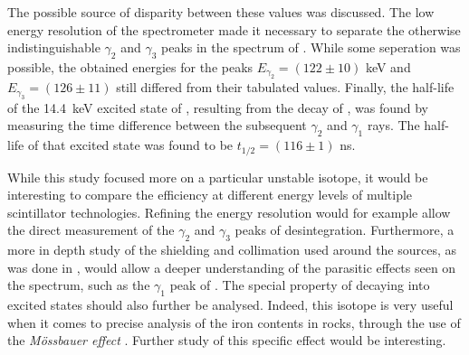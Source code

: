 The possible source of disparity between these values was discussed.
The low energy resolution of the spectrometer made it necessary to separate the otherwise indistinguishable $\gamma_2$ and $\gamma_3$ peaks in the spectrum of \cobalt.
While some seperation was possible, the obtained energies for the peaks \(E_{\gamma_2} = (122 \pm 10)\) keV and \(E_{\gamma_3} = (126 \pm 11)\) still differed from their tabulated values.
Finally, the half-life of the \mbox{14.4 keV} excited state of \iron, resulting from the decay of \cobalt, was found by measuring the time difference between the subsequent \(\gamma_2\) and \(\gamma_1\) rays.
The half-life of that excited state was found to be \(t_{1/2} = (116 \pm 1)\) ns.

While this study focused more on a particular unstable isotope, it would be interesting to compare the efficiency at different energy levels of multiple scintillator technologies.
Refining the energy resolution would for example allow the direct measurement of the \(\gamma_2\) and \(\gamma_3\) peaks of \cobalt desintegration.
Furthermore, a more in depth study of the shielding and collimation used around the sources, as was done in \cite{smith_evaluation_2008}, would allow a deeper understanding of the parasitic effects seen on the spectrum, such as the \(\gamma_1\) peak of \lead.
The special property of \cobalt decaying into excited \iron states should also further be analysed.
Indeed, this isotope is very useful when it comes to precise analysis of the iron contents in rocks, through the use of the \emph{Mössbauer effect} \cite{klingelhofer_mossbauer_2004}.
Further study of this specific effect would be interesting.
